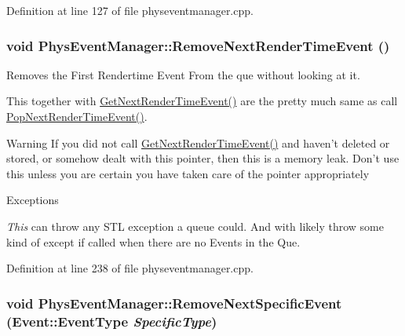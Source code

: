 Definition at line 127 of file physeventmanager.cpp.

\hypertarget{classPhysEventManager_a56acc075e743921e27284c023b3298ce}{
\subsubsection[{RemoveNextRenderTimeEvent}]{\setlength{\rightskip}{0pt plus 5cm}void PhysEventManager::RemoveNextRenderTimeEvent ()}}
\label{d5/dd7/classPhysEventManager_a56acc075e743921e27284c023b3298ce}


Removes the First Rendertime Event From the que without looking at it. 

This together with \hyperlink{classPhysEventManager_a1f2d0506ce816176913e5bdfaa9fd724}{GetNextRenderTimeEvent()} are the pretty much same as call \hyperlink{classPhysEventManager_ad627925363fdbcff98e0faef204e81e2}{PopNextRenderTimeEvent()}. \begin{DoxyWarning}{Warning}
If you did not call \hyperlink{classPhysEventManager_a1f2d0506ce816176913e5bdfaa9fd724}{GetNextRenderTimeEvent()} and haven't deleted or stored, or somehow dealt with this pointer, then this is a memory leak. Don't use this unless you are certain you have taken care of the pointer appropriately 
\end{DoxyWarning}

\begin{DoxyExceptions}{Exceptions}
\item[{\em This}]can throw any STL exception a queue could. And with likely throw some kind of except if called when there are no Events in the Que. \end{DoxyExceptions}


Definition at line 238 of file physeventmanager.cpp.

\hypertarget{classPhysEventManager_a0984ae7ac0cc0db9fb24e50156497de4}{
\subsubsection[{RemoveNextSpecificEvent}]{\setlength{\rightskip}{0pt plus 5cm}void PhysEventManager::RemoveNextSpecificEvent ({\bf Event::EventType} {\em SpecificType})}}
\label{d5/dd7/classPhysEventManager_a0984ae7ac0cc0db9fb24e50156497de4}


